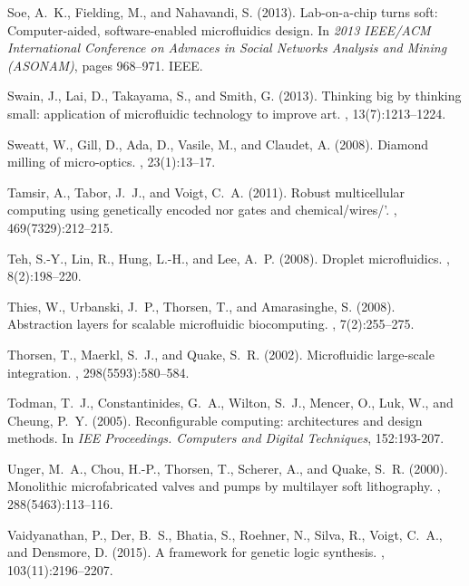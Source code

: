 \documentclass[12pt,letterpaper]{report}          %
\begin{document}
\begin{thebibliography}{}
Soe, A.~K., Fielding, M., and Nahavandi, S. (2013).
\newblock Lab-on-a-chip turns soft: Computer-aided, software-enabled
  microfluidics design.
\newblock In {\em 2013 IEEE/ACM International Conference on Advnaces in Social Networks Analysis and Mining (ASONAM)}, pages 968--971. IEEE.

Swain, J., Lai, D., Takayama, S., and Smith, G. (2013).
\newblock Thinking big by thinking small: application of microfluidic
  technology to improve art.
, 13(7):1213--1224.

Sweatt, W., Gill, D., Ada, D., Vasile, M., and Claudet, A. (2008).
\newblock Diamond milling of micro-optics.
, 23(1):13--17.

Tamsir, A., Tabor, J.~J., and Voigt, C.~A. (2011).
\newblock Robust multicellular computing using genetically encoded nor gates
  and chemical/wires/'.
, 469(7329):212--215.

Teh, S.-Y., Lin, R., Hung, L.-H., and Lee, A.~P. (2008).
\newblock Droplet microfluidics.
, 8(2):198--220.

Thies, W., Urbanski, J.~P., Thorsen, T., and Amarasinghe, S. (2008).
\newblock Abstraction layers for scalable microfluidic biocomputing.
, 7(2):255--275.

Thorsen, T., Maerkl, S.~J., and Quake, S.~R. (2002).
\newblock Microfluidic large-scale integration.
, 298(5593):580--584.

Todman, T.~J., Constantinides, G.~A., Wilton, S.~J., Mencer, O., Luk, W., and
  Cheung, P.~Y. (2005).
\newblock Reconfigurable computing: architectures and design methods.
\newblock In {\em IEE Proceedings. Computers and Digital Techniques}, 152:193-207.

Unger, M.~A., Chou, H.-P., Thorsen, T., Scherer, A., and Quake, S.~R. (2000).
\newblock Monolithic microfabricated valves and pumps by multilayer soft
  lithography.
, 288(5463):113--116.

Vaidyanathan, P., Der, B.~S., Bhatia, S., Roehner, N., Silva, R., Voigt, C.~A.,
  and Densmore, D. (2015).
\newblock A framework for genetic logic synthesis.
, 103(11):2196--2207.


\end{thebibliography}
\end{document}
